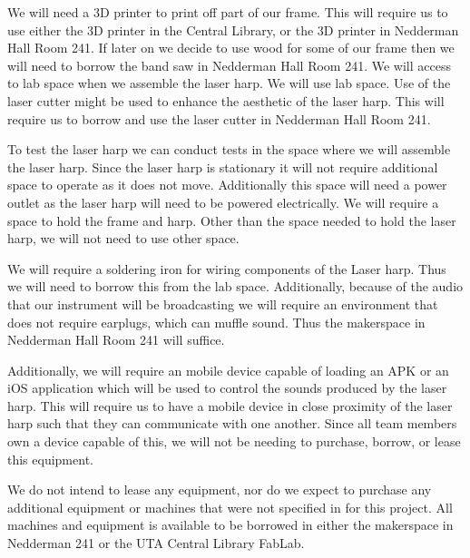 We will need a 3D printer to print off part of our frame. This will require us to use either the 3D printer in the Central Library, or the 3D printer in Nedderman Hall Room 241. If later on we decide to use wood for some of our frame then we will need to borrow the band saw in Nedderman Hall Room 241. We will access to lab space when we assemble the laser harp. We will use lab space. Use of the laser cutter might be used to enhance the aesthetic of the laser harp. This will require us to borrow and use the laser cutter in Nedderman Hall Room 241. 

To test the laser harp we can conduct tests in the space where we will assemble the laser harp. Since the laser harp is stationary it will not require additional space to operate as it does not move. Additionally this space will need a power outlet as the laser harp will need to be powered electrically. We will require a space to hold the frame and harp. Other than the space needed to hold the laser harp, we will not need to use other space.

We will require a soldering iron for wiring components of the Laser harp. Thus we will need to borrow this from the lab space. Additionally, because of the audio that our instrument will be broadcasting we will require an environment that does not require earplugs, which can muffle sound. Thus the makerspace in Nedderman Hall Room 241 will suffice.

Additionally, we will require an mobile device capable of loading an APK or an iOS application which will be used to control the sounds produced by the laser harp. This will require us to have a mobile device in close proximity of the laser harp such that they can communicate with one another. Since all team members own a device capable of this, we will not be needing to purchase, borrow, or lease this equipment.

We do not intend to lease any equipment, nor do we expect to purchase any additional equipment or machines that were not specified in for this project. All machines and equipment is available to be borrowed in either the makerspace in Nedderman 241 or the UTA Central Library FabLab.